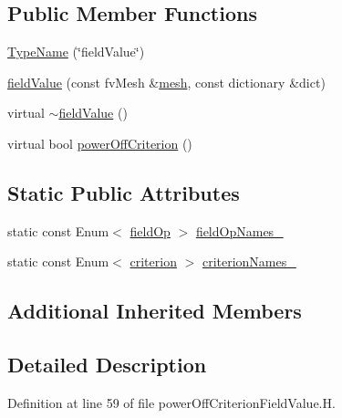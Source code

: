 \subsection*{Public Member Functions}
\begin{DoxyCompactItemize}
\item 
\hyperlink{classFoam_1_1powerOffCriterionModels_1_1fieldValue_a4e2374ac02a32a11a6b0bcc9acd78928}{Type\+Name} (\char`\"{}field\+Value\char`\"{})
\item 
\hyperlink{classFoam_1_1powerOffCriterionModels_1_1fieldValue_aa87cd13c5509620c4d76d20da8c10a0c}{field\+Value} (const fv\+Mesh \&\hyperlink{createMeshesPostProcess_8H_a8bb1e58291d2d2b653e024a4f4bffe38}{mesh}, const dictionary \&dict)
\item 
virtual \hyperlink{classFoam_1_1powerOffCriterionModels_1_1fieldValue_a5f6d66b58e103d219bcbd167d168366c}{$\sim$field\+Value} ()
\item 
virtual bool \hyperlink{classFoam_1_1powerOffCriterionModels_1_1fieldValue_af50e5b3df017f27103aff3abd4346b05}{power\+Off\+Criterion} ()
\end{DoxyCompactItemize}
\subsection*{Static Public Attributes}
\begin{DoxyCompactItemize}
\item 
static const Enum$<$ \hyperlink{classFoam_1_1powerOffCriterionModels_1_1fieldValue_a2a8a9cf981c246590644d7a7c9d8f2eb}{field\+Op} $>$ \hyperlink{classFoam_1_1powerOffCriterionModels_1_1fieldValue_ab7b61a5c7dec7379696540325df4c924}{field\+Op\+Names\+\_\+}
\item 
static const Enum$<$ \hyperlink{classFoam_1_1powerOffCriterionModels_1_1fieldValue_a870e2f6afd9ddff2973bfa200173f120}{criterion} $>$ \hyperlink{classFoam_1_1powerOffCriterionModels_1_1fieldValue_a08173cdb919fefba739a97e6da4949a3}{criterion\+Names\+\_\+}
\end{DoxyCompactItemize}
\subsection*{Additional Inherited Members}


\subsection{Detailed Description}


Definition at line 59 of file power\+Off\+Criterion\+Field\+Value.\+H.




